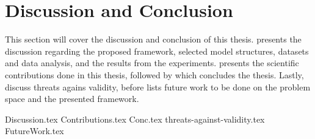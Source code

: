 \chapter{Discussion and Conclusion}

\label{section:Discussion}

This section will cover the discussion and conclusion of this thesis.
 presents the discussion regarding the proposed framework,
selected model structures, datasets and data analysis, and the results from the experiments.
 presents the scientific contributions done in this thesis,
followed by  which concludes the thesis.
Lastly,  discuss threats agains validity,
before  lists future work to be done on the problem space and the presented framework.


{Discussion.tex}
{Contributions.tex}
{Conc.tex}
{threats-against-validity.tex}
{FutureWork.tex}

